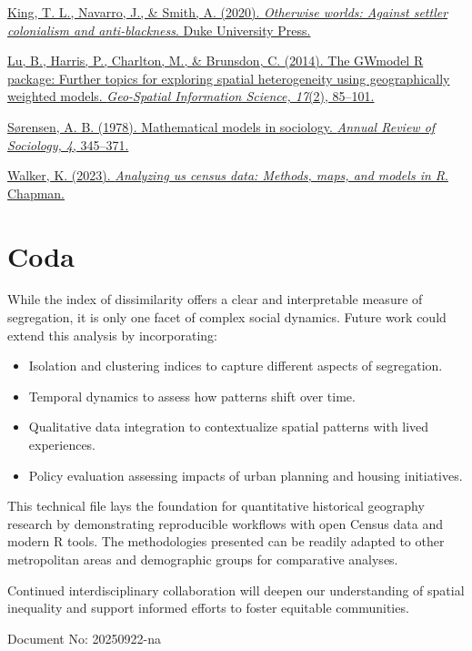 \documentclass[
  letterpaper,
  DIV=11,
  numbers=noendperiod]{scrartcl}
\providecommand{\tightlist}{%
  \setlength{\itemsep}{0pt}\setlength{\parskip}{0pt}}\usepackage{longtable,booktabs,array}
\begin{document}
\href{}{King, T. L., Navarro, J., \& Smith, A. (2020). \emph{Otherwise
worlds: Against settler colonialism and anti-blackness}. Duke University
Press.}

\href{}{Lu, B., Harris, P., Charlton, M., \& Brunsdon, C. (2014). The
GWmodel R package: Further topics for exploring spatial heterogeneity
using geographically weighted models. \emph{Geo-Spatial Information
Science, 17}(2), 85--101.}

\href{}{Sørensen, A. B. (1978). Mathematical models in sociology.
\emph{Annual Review of Sociology, 4}, 345--371.}

\href{}{Walker, K. (2023). \emph{Analyzing us census data: Methods,
maps, and models in R}. Chapman.}

\newpage

\section{Coda}\label{coda}

While the index of dissimilarity offers a clear and interpretable
measure of segregation, it is only one facet of complex social dynamics.
Future work could extend this analysis by incorporating:

\begin{itemize}
\tightlist
\item
  Isolation and clustering indices to capture different aspects of
  segregation.
\item
  Temporal dynamics to assess how patterns shift over time.
\item
  Qualitative data integration to contextualize spatial patterns with
  lived experiences.
\item
  Policy evaluation assessing impacts of urban planning and housing
  initiatives.
\end{itemize}

This technical file lays the foundation for quantitative historical
geography research by demonstrating reproducible workflows with open
Census data and modern R tools. The methodologies presented can be
readily adapted to other metropolitan areas and demographic groups for
comparative analyses.

Continued interdisciplinary collaboration will deepen our understanding
of spatial inequality and support informed efforts to foster equitable
communities.

Document No: 20250922-na
\end{document}
